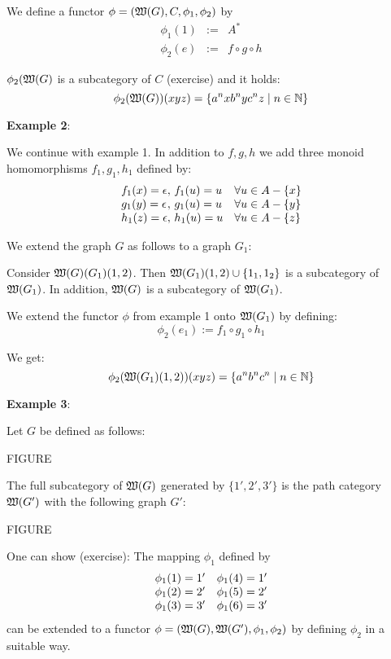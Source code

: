 We define a functor $\phi = (\mbox{$\mathfrak{W}(G)$}, C, \phi_1, \phi_2)$ by
\begin{eqnarray*}
\phi_1(1) & := & A^* \\
\phi_2(e) & := & f \circ g \circ h
\end{eqnarray*}

$\phi_2(\mbox{$\mathfrak{W}(G)$}$ is a subcategory of $C$ (exercise) and it holds:
\[ \phi_2(\mbox{$\mathfrak{W}(G)$})(xyz) = \{ a^n x b^n y c^n z \mid n \in \mathbb{N} \} \]

\bigskip
{\bf Example 2}:

We continue with example 1. In addition to $f,g,h$ we add three monoid
homomorphisms $f_1, g_1, h_1$ defined by:
\[\begin{array}{l@{,\ }l@{\quad}l}
f_1(x) = \epsilon & f_1(u) = u & \forall u \in A - \{x\} \\
g_1(y) = \epsilon & g_1(u) = u & \forall u \in A - \{y\} \\
h_1(z) = \epsilon & h_1(u) = u & \forall u \in A - \{z\}
\end{array}\]

We extend the graph $G$ as follows to a graph $G_1$:


Consider $\mbox{$\mathfrak{W}(G)$}(G_1)(1,2)$. Then $\mbox{$\mathfrak{W}(G_1)$}(1,2) \cup \{1_1, 1_2\}$ is
a subcategory of $\mbox{$\mathfrak{W}(G_1)$}$. In addition, $\mbox{$\mathfrak{W}(G)$}$ is a subcategory of
$\mbox{$\mathfrak{W}(G_1)$}$.

We extend the functor $\phi$ from example 1 onto $\mbox{$\mathfrak{W}(G_1)$}$ by defining:
\[ \phi_2(e_1) := f_1 \circ g_1 \circ h_1 \]

We get:
\[ \phi_2(\mbox{$\mathfrak{W}(G_1)$}(1,2))(xyz) = \{ a^n b^n c^n \mid n \in \mathbb{N} \} \]

\bigskip
{\bf Example 3}:

Let $G$ be defined as follows:

FIGURE

The full subcategory of $\mbox{$\mathfrak{W}(G)$}$ generated by $\{ 1', 2', 3' \}$ is the
path category $\mbox{$\mathfrak{W}(G')$}$ with the following graph $G'$:

FIGURE

One can show (exercise): The mapping $\phi_1$ defined by 
\[\begin{array}{l@{\quad}l}
\phi_1(1) = 1' & \phi_1(4) = 1' \\
\phi_1(2) = 2' & \phi_1(5) = 2' \\
\phi_1(3) = 3' & \phi_1(6) = 3'
\end{array}\]
can be extended to a functor $\phi = (\mbox{$\mathfrak{W}(G)$}, \mbox{$\mathfrak{W}(G')$}, \phi_1,
\phi_2)$ by defining $\phi_2$ in a suitable way.

